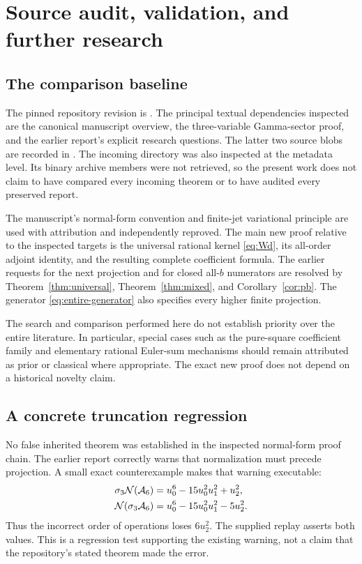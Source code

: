\section{Source audit, validation, and further research}
\label{sec:audit}

\subsection{The comparison baseline}

The pinned repository revision is \texttt{\sourcecommit}. The principal textual dependencies inspected are the canonical manuscript overview, the three-variable Gamma-sector proof, and the earlier report's explicit research questions. The latter two source blobs are recorded in . The incoming directory was also inspected at the metadata level. Its binary archive members were not retrieved, so the present work does not claim to have compared every incoming theorem or to have audited every preserved report.

The manuscript's normal-form convention and finite-jet variational principle are used with attribution and independently reproved. The main new proof relative to the inspected targets is the universal rational kernel \eqref{eq:Wd}, its all-order adjoint identity, and the resulting complete coefficient formula. The earlier requests for the next projection and for closed all-$b$ numerators are resolved by Theorem~\ref{thm:universal}, Theorem~\ref{thm:mixed}, and Corollary~\ref{cor:pb}. The generator \eqref{eq:entire-generator} also specifies every higher finite projection.

The search and comparison performed here do not establish priority over the entire literature. In particular, special cases such as the pure-square coefficient family and elementary rational Euler-sum mechanisms should remain attributed as prior or classical where appropriate. The exact new proof does not depend on a historical novelty claim.

\subsection{A concrete truncation regression}

No false inherited theorem was established in the inspected normal-form proof chain. The earlier report correctly warns that normalization must precede projection. A small exact counterexample makes that warning executable:
\begin{align}
 \sigma_3\mathcal N(\mathcal A_6)&=u_0^6-15u_0^2u_1^2+u_2^2,\label{eq:correct-truncation}\\
 \mathcal N(\sigma_3\mathcal A_6)&=u_0^6-15u_0^2u_1^2-5u_2^2.\label{eq:wrong-truncation}
\end{align}
Thus the incorrect order of operations loses $6u_2^2$. The supplied replay asserts both values. This is a regression test supporting the existing warning, not a claim that the repository's stated theorem made the error.


